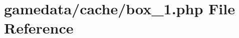 \hypertarget{box__1_8php}{\section{gamedata/cache/box\+\_\+1.php File Reference}
\label{box__1_8php}
}
